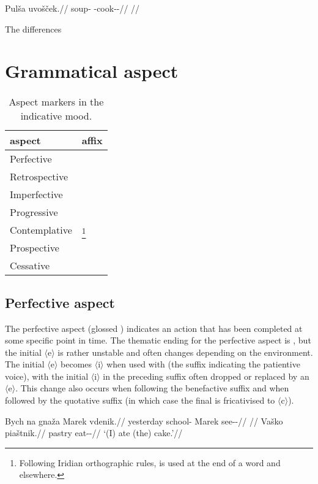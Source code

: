 \pex
\begingl
\gla Pulša uvošček.//
\glb soup-\Acc{} \Refl{}-cook-\Av{}-\Pf{}//
\glft {}//
\endgl
\xe


\par The differences

\section{Grammatical aspect}
\begin{table}[h!]\small
	\caption{Aspect markers in the indicative mood.}
	\medskip
	\begin{tabu} to 0.5\textwidth{YY[0.5]}
		\toprule
		{\sc aspect}	& {\sc affix}\\
		\midrule
		Perfective		& \\
		Retrospective	& \\
		Imperfective	& \\
		Progressive		&  \\
		Contemplative	& \footnote{Following Iridian orthographic rules,  is used at the end of a word and  elsewhere.}\\
		Prospective		& \\
		Cessative		& \\
		\bottomrule
	\end{tabu}

\end{table}
\subsection{Perfective aspect}
The perfective aspect (glossed \Pf{}) indicates an action that has been completed at some specific point in time. The thematic ending for the perfective aspect is , but the initial $\langle$e$\rangle$ is rather unstable and often changes depending on the environment. The initial $\langle$e$\rangle$ becomes $\langle$i$\rangle$ when used with  (the suffix indicating the patientive voice), with the initial $\langle$i$\rangle$ in the preceding suffix often dropped or replaced by an $\langle$e$\rangle$. This change also occurs when following the benefactive suffix  and when followed by the quotative suffix  (in which case the final  is fricativised to $\langle$c$\rangle$).

\pex
\a\begingl
\gla Bych na gnaža Marek vdenik.//
\glb yesterday \Loc{} school-\Acc{} Marek see-\Pv{}-\Pf{}//
\glft {}//
\endgl
\a\begingl
\gla Vaško piaštnik.//
\glb pastry eat-\Pv{}-\Pf{}//
\glft `(I) ate (the) cake.'//
\endgl
\xe


